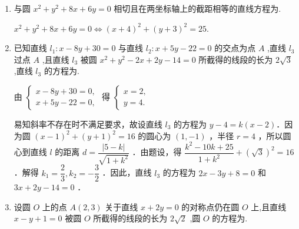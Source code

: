 \begin{enumerate}
    \item 与圆 ${x}^{2} + {y}^{2} + {8x} + {6y} = 0$ 相切且在两坐标轴上的截距相等的直线方程为.
    \begin{jieda}
        ${x}^{2} + {y}^{2} + {8x} + {6y} = 0 \Longleftrightarrow (x+4)^2+(y+3)^2 = 25$.
        
    \end{jieda}

    \item 已知直线 ${l}_{1} : x - {8y} + {30} = 0$ 与直线 ${l}_{2} : x + {5y} - {22} = 0$ 的交点为点 $A$ ,直线 ${l}_{3}$ 过点 $A$ ,且直线 ${l}_{3}$ 被圆 ${x}^{2} + {y}^{2} - {2x} + {2y} - {14} = 0$ 所截得的线段的长为 $2\sqrt{3}$ ,直线 ${l}_{3}$ 的方程为.
    \begin{jieda}
        由 $\left\{\begin{array}{l}x-8 y+30=0, \\ x+5 y-22=0,\end{array}\right.$ 得 $\left\{\begin{array}{l}x=2, \\ y=4 .\end{array}\right.$ 
        
        易知斜率不存在时不满足要求，故设直线 $l_3$ 的方程为 $y-4=k(x-2)$．因为圆 $(x-1)^2+(y+1)^2 =16$ 的圆心为 $(1,-1)$ ，半径 $r=4$ ，所以圆心到直线 $l$ 的距离 $d=\dfrac{|5-k|}{\sqrt{1+k^2}}$ ．由题设，得 $\dfrac{k^2-10 k+25}{1+k^2}+ (\sqrt{3})^2=16$ ．解得 $k_1=\dfrac{2}{3}, k_2=-\dfrac{3}{2}$ ．因此，直线 $l_3$ 的方程为 $2 x-3 y+8=0$ 和 $3 x+2 y-14=0$ ．
    \end{jieda}

    
    \item 设圆 $O$ 上的点 $A\left( {2,3}\right)$ 关于直线 $x + {2y} = 0$ 的对称点仍在圆 $O$ 上,且直线$x - y + 1 = 0$ 被圆 $O$ 所截得的线段的长为 $2\sqrt{2}$ ,圆 $O$ 的方程为.
    

\end{enumerate}
